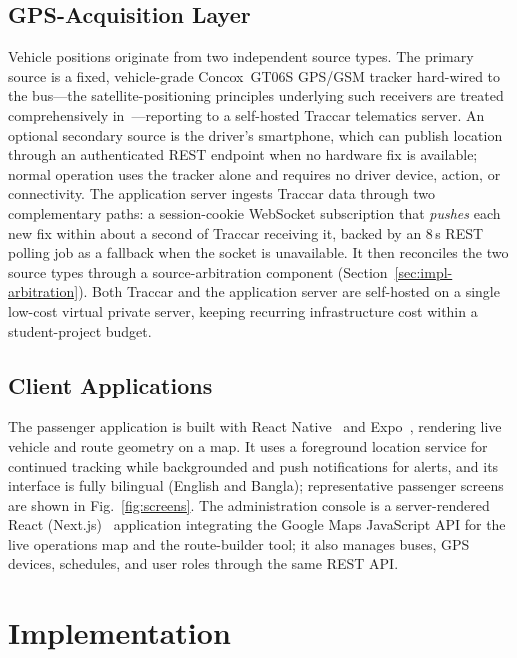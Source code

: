\documentclass[conference]{IEEEtran}
\begin{document}
\subsection{GPS-Acquisition Layer}
Vehicle positions originate from two independent source types. The primary
source is a fixed, vehicle-grade Concox~GT06S GPS/GSM tracker hard-wired to
the bus---the satellite-positioning principles underlying such receivers are
treated comprehensively in~\cite{kaplan}---reporting to a self-hosted Traccar
telematics server. An optional
secondary source is the driver's smartphone, which can publish location
through an authenticated REST endpoint when no hardware fix is available;
normal operation uses the tracker alone and requires no driver device,
action, or connectivity. The
application server ingests Traccar data through two complementary paths: a
session-cookie WebSocket subscription that \emph{pushes} each new fix within
about a second of Traccar receiving it, backed by an 8\,s REST polling job as a
fallback when the socket is unavailable. It then reconciles the two source
types through a source-arbitration component
(Section~\ref{sec:impl-arbitration}). Both Traccar and the application
server are self-hosted on a single low-cost virtual private server, keeping
recurring infrastructure cost within a student-project budget.

\subsection{Client Applications}
The passenger application is built with React Native~\cite{reactnative} and
Expo~\cite{expo}, rendering live vehicle and route geometry on a map. It uses a foreground location service
for continued tracking while backgrounded and push notifications for alerts,
and its interface is fully bilingual (English and Bangla); representative
passenger screens are shown in Fig.~\ref{fig:screens}. The administration
console is a server-rendered React (Next.js)~\cite{nextjs} application integrating the
Google Maps JavaScript API for the live operations map and the route-builder
tool; it also manages buses, GPS devices, schedules, and user roles through
the same REST API.

\section{Implementation}
\label{sec:implementation}
\end{document}
